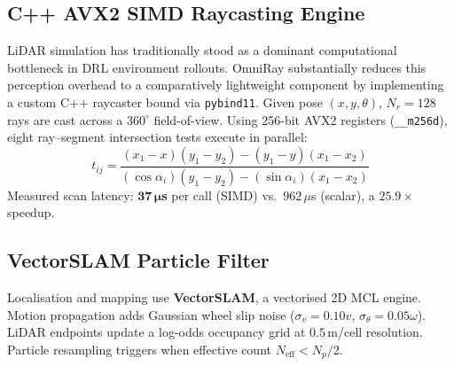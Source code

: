 \documentclass[conference]{IEEEtran}
\begin{document}
\subsection{C++ AVX2 SIMD Raycasting Engine}
LiDAR simulation has traditionally stood as a dominant computational bottleneck in DRL environment rollouts. OmniRay substantially reduces this perception overhead to a comparatively lightweight component by implementing a custom C++ raycaster bound via \texttt{pybind11}. Given pose $(x, y, \theta)$, $N_r\!=\!128$ rays are cast across a $360^\circ$ field-of-view.
Using 256-bit AVX2 registers (\texttt{\_\_m256d}), eight ray--segment intersection tests execute in parallel:
\begin{equation}
t_{ij} = \frac{(x_1\!-\!x)(y_1\!-\!y_2) - (y_1\!-\!y)(x_1\!-\!x_2)}{(\cos\alpha_i)(y_1\!-\!y_2) - (\sin\alpha_i)(x_1\!-\!x_2)}
\end{equation}
Measured scan latency: $\mathbf{37\,\mu}$\textbf{s} per call (SIMD) vs.\ $962\,\mu$s (scalar), a $25.9\times$ speedup.

\subsection{VectorSLAM Particle Filter}
Localisation and mapping use \textbf{VectorSLAM}, a vectorised 2D MCL engine.
Motion propagation adds Gaussian wheel slip noise ($\sigma_v\!=\!0.10 v$, $\sigma_\theta\!=\!0.05\omega$).
LiDAR endpoints update a log-odds occupancy grid at $0.5$\,m/cell resolution.
Particle resampling triggers when effective count $N_{\text{eff}} < N_p/2$.
\end{document}

